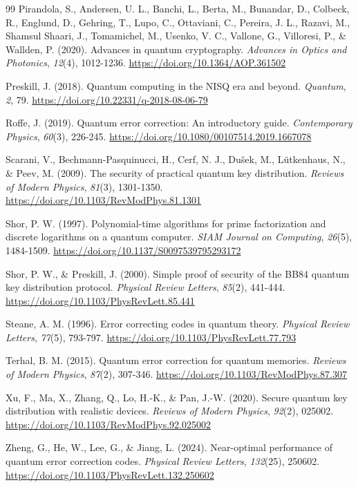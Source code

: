 \documentclass[12pt]{report}
\begin{document}
\begin{thebibliography}{99}
 Pirandola, S., Andersen, U. L., Banchi, L., Berta, M., Bunandar, D., Colbeck, R., Englund, D., Gehring, T., Lupo, C., Ottaviani, C., Pereira, J. L., Razavi, M., Shamsul Shaari, J., Tomamichel, M., Usenko, V. C., Vallone, G., Villoresi, P., \& Wallden, P. (2020). Advances in quantum cryptography. \textit{Advances in Optics and Photonics}, \textit{12}(4), 1012-1236. \url{https://doi.org/10.1364/AOP.361502}

 Preskill, J. (2018). Quantum computing in the NISQ era and beyond. \textit{Quantum}, \textit{2}, 79. \url{https://doi.org/10.22331/q-2018-08-06-79}

 Roffe, J. (2019). Quantum error correction: An introductory guide. \textit{Contemporary Physics}, \textit{60}(3), 226-245. \url{https://doi.org/10.1080/00107514.2019.1667078}

 Scarani, V., Bechmann-Pasquinucci, H., Cerf, N. J., Du\v{s}ek, M., L\"utkenhaus, N., \& Peev, M. (2009). The security of practical quantum key distribution. \textit{Reviews of Modern Physics}, \textit{81}(3), 1301-1350. \url{https://doi.org/10.1103/RevModPhys.81.1301}

 Shor, P. W. (1997). Polynomial-time algorithms for prime factorization and discrete logarithms on a quantum computer. \textit{SIAM Journal on Computing}, \textit{26}(5), 1484-1509. \url{https://doi.org/10.1137/S0097539795293172}

 Shor, P. W., \& Preskill, J. (2000). Simple proof of security of the BB84 quantum key distribution protocol. \textit{Physical Review Letters}, \textit{85}(2), 441-444. \url{https://doi.org/10.1103/PhysRevLett.85.441}

 Steane, A. M. (1996). Error correcting codes in quantum theory. \textit{Physical Review Letters}, \textit{77}(5), 793-797. \url{https://doi.org/10.1103/PhysRevLett.77.793}

 Terhal, B. M. (2015). Quantum error correction for quantum memories. \textit{Reviews of Modern Physics}, \textit{87}(2), 307-346. \url{https://doi.org/10.1103/RevModPhys.87.307}

 Xu, F., Ma, X., Zhang, Q., Lo, H.-K., \& Pan, J.-W. (2020). Secure quantum key distribution with realistic devices. \textit{Reviews of Modern Physics}, \textit{92}(2), 025002. \url{https://doi.org/10.1103/RevModPhys.92.025002}

 Zheng, G., He, W., Lee, G., \& Jiang, L. (2024). Near-optimal performance of quantum error correction codes. \textit{Physical Review Letters}, \textit{132}(25), 250602. \url{https://doi.org/10.1103/PhysRevLett.132.250602}

\end{thebibliography}
\end{document}
